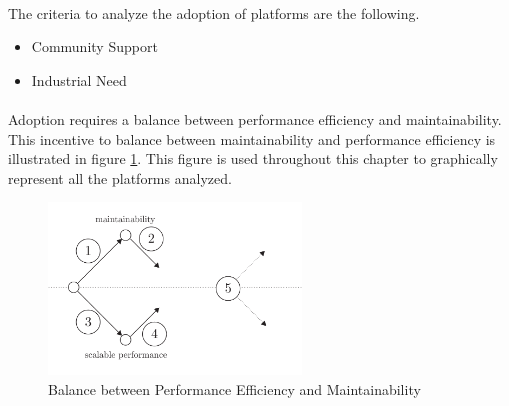 \paragraph{}

The criteria to analyze the adoption of platforms are the following.

\begin{itemize}
\item Community Support
\item Industrial Need
\end{itemize}

\paragraph{}

Adoption requires a balance between performance efficiency and maintainability.
This incentive to balance between maintainability and performance efficiency is illustrated in figure \ref{fig:state-of-the-art}.
This figure is used throughout this chapter to graphically represent all the platforms analyzed.

\begin{figure}[h!]
\begin{center}
\includegraphics[width=0.6\textwidth]{../ressources/state-of-the-art.pdf}
\end{center}
\caption{Balance between Performance Efficiency and Maintainability}
\label{fig:state-of-the-art}
\end{figure}








